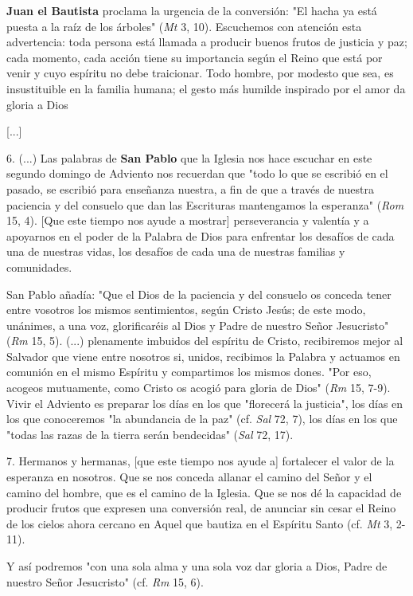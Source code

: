 \begin{body}
\begin{body}
\textbf{Juan el Bautista} proclama la urgencia de la conversión: "El hacha ya está puesta a la raíz de los árboles" (\emph{Mt} 3, 10). Escuchemos con atención esta advertencia: toda persona está llamada a producir buenos frutos de justicia y paz; cada momento, cada acción tiene su importancia según el Reino que está por venir y cuyo espíritu no debe traicionar. Todo hombre, por modesto que sea, es insustituible en la familia humana; el gesto más humilde inspirado por el amor da gloria a Dios

{[}...{]}

6. (...) Las palabras de \textbf{San Pablo} que la Iglesia nos hace escuchar en este segundo domingo de Adviento nos recuerdan que "todo lo que se escribió en el pasado, se escribió para enseñanza nuestra, a fin de que a través de nuestra paciencia y del consuelo que dan las Escrituras mantengamos la esperanza" (\emph{Rom} 15, 4). {[}Que este tiempo nos ayude a mostrar{]} perseverancia y valentía y a apoyarnos en el poder de la Palabra de Dios para enfrentar los desafíos de cada una de nuestras vidas, los desafíos de cada una de nuestras familias y comunidades.

San Pablo añadía: "Que el Dios de la paciencia y del consuelo os conceda tener entre vosotros los mismos sentimientos, según Cristo Jesús; de este modo, unánimes, a una voz, glorificaréis al Dios y Padre de nuestro Señor Jesucristo" (\emph{Rm} 15, 5). (...) plenamente imbuidos del espíritu de Cristo, recibiremos mejor al Salvador que viene entre nosotros si, unidos, recibimos la Palabra y actuamos en comunión en el mismo Espíritu y compartimos los mismos dones. "Por eso, acogeos mutuamente, como Cristo os acogió para gloria de Dios" (\emph{Rm} 15, 7-9). Vivir el Adviento es preparar los días en los que "florecerá la justicia", los días en los que conoceremos "la abundancia de la paz" (cf. \emph{Sal} 72, 7), los días en los que "todas las razas de la tierra serán bendecidas" (\emph{Sal} 72, 17).

7. Hermanos y hermanas, {[}que este tiempo nos ayude a{]} fortalecer el valor de la esperanza en nosotros. Que se nos conceda allanar el camino del Señor y el camino del hombre, que es el camino de la Iglesia. Que se nos dé la capacidad de producir frutos que expresen una conversión real, de anunciar sin cesar el Reino de los cielos ahora cercano en Aquel que bautiza en el Espíritu Santo (cf. \emph{Mt} 3, 2-11).

Y así podremos "con una sola alma y una sola voz dar gloria a Dios, Padre de nuestro Señor Jesucristo" (cf. \emph{Rm} 15, 6).
\end{body} 
	

\end{body}
